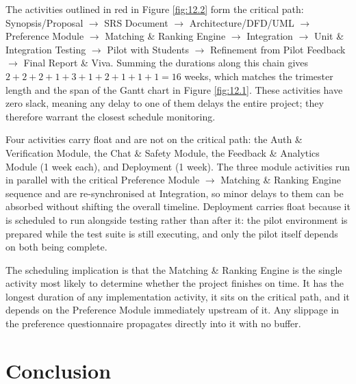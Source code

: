\documentclass[12pt,a4paper]{report}
\begin{document}
The activities outlined in red in Figure \ref{fig:12.2} form the critical path: Synopsis/Proposal $\rightarrow$ SRS Document $\rightarrow$ Architecture/DFD/UML $\rightarrow$ Preference Module $\rightarrow$ Matching \& Ranking Engine $\rightarrow$ Integration $\rightarrow$ Unit \& Integration Testing $\rightarrow$ Pilot with Students $\rightarrow$ Refinement from Pilot Feedback $\rightarrow$ Final Report \& Viva. Summing the durations along this chain gives $2+2+2+1+3+1+2+1+1+1 = 16$ weeks, which matches the trimester length and the span of the Gantt chart in Figure \ref{fig:12.1}. These activities have zero slack, meaning any delay to one of them delays the entire project; they therefore warrant the closest schedule monitoring.

Four activities carry float and are not on the critical path: the Auth \& Verification Module, the Chat \& Safety Module, the Feedback \& Analytics Module (1 week each), and Deployment (1 week). The three module activities run in parallel with the critical Preference Module $\rightarrow$ Matching \& Ranking Engine sequence and are re-synchronised at Integration, so minor delays to them can be absorbed without shifting the overall timeline. Deployment carries float because it is scheduled to run alongside testing rather than after it: the pilot environment is prepared while the test suite is still executing, and only the pilot itself depends on both being complete.

The scheduling implication is that the Matching \& Ranking Engine is the single activity most likely to determine whether the project finishes on time. It has the longest duration of any implementation activity, it sits on the critical path, and it depends on the Preference Module immediately upstream of it. Any slippage in the preference questionnaire propagates directly into it with no buffer.

\chapter{Conclusion}
\end{document}
